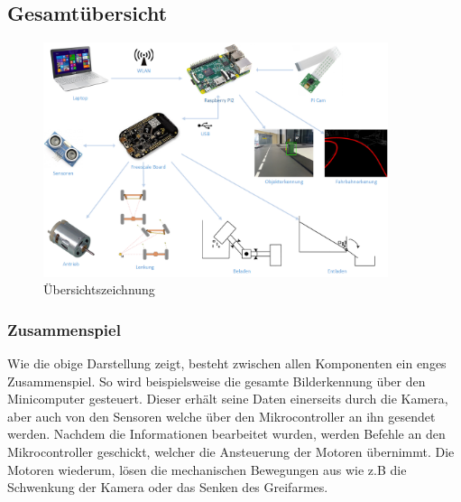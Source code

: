 \subsection{Gesamtübersicht}
\begin{figure}[H]%
\centering
\includegraphics[width=0.9\textwidth]{03_Loesungskonzept/pictures/uebersichtszeichnung.png}
\caption{Übersichtszeichnung}
\label{fig:Übersichtszeichnung}
\end{figure}
\subsubsection{Zusammenspiel}
Wie die obige Darstellung zeigt, besteht zwischen allen Komponenten ein enges Zusammenspiel. So wird beispielsweise die gesamte Bilderkennung über den Minicomputer gesteuert. Dieser erhält seine Daten einerseits durch die Kamera, aber auch von den Sensoren welche über den Mikrocontroller an ihn gesendet werden. Nachdem die Informationen bearbeitet wurden, werden Befehle an den Mikrocontroller geschickt, welcher die Ansteuerung der Motoren übernimmt. Die Motoren wiederum, lösen die mechanischen Bewegungen aus wie z.B die Schwenkung der Kamera oder das Senken des Greifarmes.
